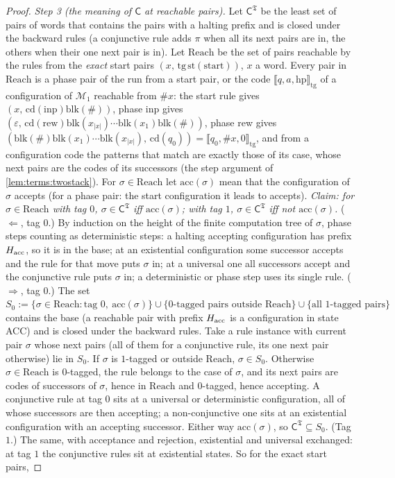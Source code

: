\begin{proof}
\emph{Step 3 (the meaning of $\mathsf C$ at reachable pairs).} Let $\mathsf C^{\mathfrak T}$ be the least set of pairs of words that contains the pairs with a halting prefix and is closed under the backward rules (a conjunctive rule adds $\pi$ when all its next pairs are in, the others when their one next pair is in). Let $\mathrm{Reach}$ be the set of pairs reachable by the rules from the \emph{exact} start pairs $(x,\,\mathrm{tg}\,\mathrm{st}(\mathrm{start}))$, $x$ a word. Every pair in $\mathrm{Reach}$ is a phase pair of the run from a start pair, or the code $\llbracket q,a,\mathrm{hp}\rrbracket_{\mathrm{tg}}$ of a configuration of $\mathcal M_1$ reachable from $\#x$: the start rule gives $(x,\,\mathrm{cd}(\mathrm{inp})\mathrm{blk}(\#))$, phase inp gives $(\varepsilon,\,\mathrm{cd}(\mathrm{rew})\mathrm{blk}(x_{\lvert x\rvert})\cdots\mathrm{blk}(x_1)\mathrm{blk}(\#))$, phase rew gives $(\mathrm{blk}(\#)\mathrm{blk}(x_1)\cdots\mathrm{blk}(x_{\lvert x\rvert}),\,\mathrm{cd}(q_0))=\llbracket q_0,\#x,0\rrbracket_{\mathrm{tg}}$, and from a configuration code the patterns that match are exactly those of its case, whose next pairs are the codes of its successors (the step argument of \cref{lem:terms:twostack}). For $\sigma\in\mathrm{Reach}$ let $\mathrm{acc}(\sigma)$ mean that the configuration of $\sigma$ accepts (for a phase pair: the start configuration it leads to accepts). \emph{Claim: for $\sigma\in\mathrm{Reach}$ with tag $0$, $\sigma\in\mathsf C^{\mathfrak T}$ iff $\mathrm{acc}(\sigma)$; with tag $1$, $\sigma\in\mathsf C^{\mathfrak T}$ iff not $\mathrm{acc}(\sigma)$.} ($\Leftarrow$, tag $0$.) By induction on the height of the finite computation tree of $\sigma$, phase steps counting as deterministic steps: a halting accepting configuration has prefix $H_{\rm acc}$, so it is in the base; at an existential configuration some successor accepts and the rule for that move puts $\sigma$ in; at a universal one all successors accept and the conjunctive rule puts $\sigma$ in; a deterministic or phase step uses its single rule. ($\Rightarrow$, tag $0$.) The set $S_0:=\{\sigma\in\mathrm{Reach}:\text{tag }0,\ \mathrm{acc}(\sigma)\}\cup\{\text{0-tagged pairs outside }\mathrm{Reach}\}\cup\{\text{all 1-tagged pairs}\}$ contains the base (a reachable pair with prefix $H_{\rm acc}$ is a configuration in state ACC) and is closed under the backward rules. Take a rule instance with current pair $\sigma$ whose next pairs (all of them for a conjunctive rule, its one next pair otherwise) lie in $S_0$. If $\sigma$ is $1$-tagged or outside $\mathrm{Reach}$, $\sigma\in S_0$. Otherwise $\sigma\in\mathrm{Reach}$ is $0$-tagged, the rule belongs to the case of $\sigma$, and its next pairs are codes of successors of $\sigma$, hence in $\mathrm{Reach}$ and $0$-tagged, hence accepting. A conjunctive rule at tag $0$ sits at a universal or deterministic configuration, all of whose successors are then accepting; a non-conjunctive one sits at an existential configuration with an accepting successor. Either way $\mathrm{acc}(\sigma)$, so $\mathsf C^{\mathfrak T}\subseteq S_0$. (Tag $1$.) The same, with acceptance and rejection, existential and universal exchanged: at tag $1$ the conjunctive rules sit at existential states. So for the exact start pairs, 
\end{proof}
